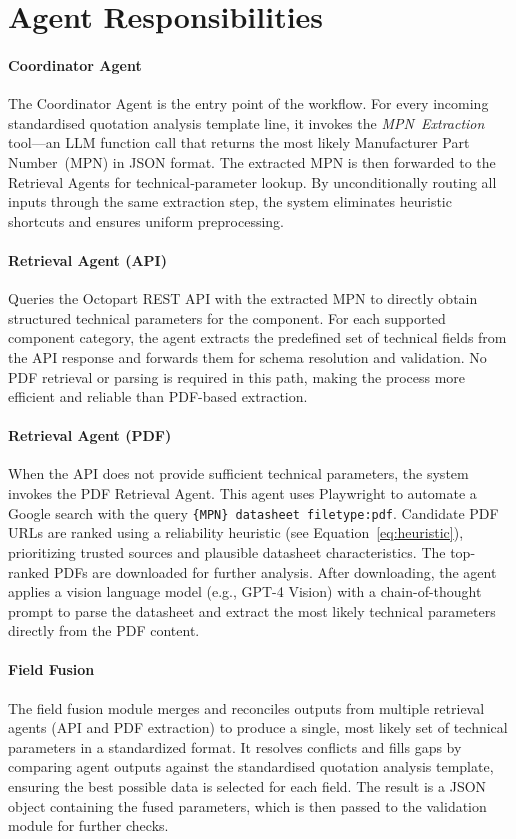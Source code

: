 \section{Agent Responsibilities}

\paragraph{Coordinator Agent}  
The Coordinator Agent is the entry point of the workflow. For every incoming standardised quotation analysis template line, it invokes the \emph{MPN~Extraction} tool—an LLM function call that returns the most likely Manufacturer Part Number~(MPN) in JSON format. The extracted MPN is then forwarded to the Retrieval Agents for technical‐parameter lookup. By unconditionally routing all inputs through the same extraction step, the system eliminates heuristic shortcuts and ensures uniform preprocessing.


\paragraph{Retrieval Agent (API)}  
Queries the Octopart REST API with the extracted MPN to directly obtain structured technical parameters for the component.  
For each supported component category, the agent extracts the predefined set of technical fields from the API response and forwards them for schema resolution and validation.  
No PDF retrieval or parsing is required in this path, making the process more efficient and reliable than PDF-based extraction.

\paragraph{Retrieval Agent (PDF)}  
When the API does not provide sufficient technical parameters, the system invokes the PDF Retrieval Agent. This agent uses Playwright to automate a Google search with the query  
\texttt{\{MPN\} datasheet filetype:pdf}.  
Candidate PDF URLs are ranked using a reliability heuristic (see Equation~\ref{eq:heuristic}), prioritizing trusted sources and plausible datasheet characteristics. The top-ranked PDFs are downloaded for further analysis.  
After downloading, the agent applies a vision language model (e.g., GPT-4 Vision) with a chain-of-thought prompt to parse the datasheet and extract the most likely technical parameters directly from the PDF content.

\paragraph{Field Fusion}
The field fusion module merges and reconciles outputs from multiple retrieval agents (API and PDF extraction) to produce a single, most likely set of technical parameters in a standardized format. It resolves conflicts and fills gaps by comparing agent outputs against the standardised quotation analysis template, ensuring the best possible data is selected for each field. The result is a JSON object containing the fused parameters, which is then passed to the validation module for further checks.

